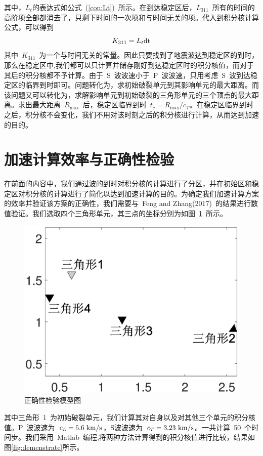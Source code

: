 \noindent 其中，$L_{t}$的表达式如公式~(\ref{con:Lt})~所示。在到达稳定区后，$L_{311}$~所有的时间的高阶项全部都消去了，只剩下时间的一次项和与时间无关的项。代入到积分核计算公式，可以得到
\begin{equation}
    K_{311} = L_{t} \rm{d}t
\end{equation} 
其中~$K_{311}$~为一个与时间无关的常量。因此只要找到了地震波达到稳定区的到时，那么在稳定区中,我们都可以只计算并储存刚好到达稳定区时的积分核值，而对于其后的积分核都不予计算。由于~S~波波速小于~P~波波速，只用考虑~S~波到达稳定区的临界到时即可。问题转化为，求初始破裂单元到其影响单元的最大距离。而该问题又可以转化为，求解影响单元到初始破裂的三角形单元的三个顶点的最大距离。求出最大距离~$R_{\max}$~后，稳定区临界到时~$t_c = R_{\max} / c_T$。在稳定区临界到时之后，积分核不会变化，我们不用对该时刻之后的积分核进行计算，从而达到加速的目的。
    \section{加速计算效率与正确性检验}
\indent 在前面的内容中，我们通过波的到时对积分核的计算进行了分区，并在初始区和稳定区对积分核的计算进行了简化以达到加速计算的目的。为确定我们加速计算方案的效率并验证该方案的正确性，我们需要与~Feng and Zhang(2017)~的结果进行数值验证。我们选取四个三角形单元，其三点的坐标分别为如图~\ref{fig:model-4}~所示。
\begin{figure}[H]
    \centerin
   \includegraphics[trim = 0mm 0mm 10mm 0mm, clip=true,width=0.98\linewidth]{img/model.eps}
    \caption{正确性检验模型图} \label{fig:model-4}
  \end{figure}
其中三角形~1~为初始破裂单元，我们计算其对自身以及对其他三个单元的积分核值。P~波波速为~$c_{L} = 5.6~{\rm{km/s}}$，S波波速为~$c_{T} = 3.23~{\rm{km/s}}$。一共计算~50~个时间步。我们采用~Matlab~编程,将两种方法计算得到的积分核值进行比较，结果如图\ref{fig:demenstrate}所示。

